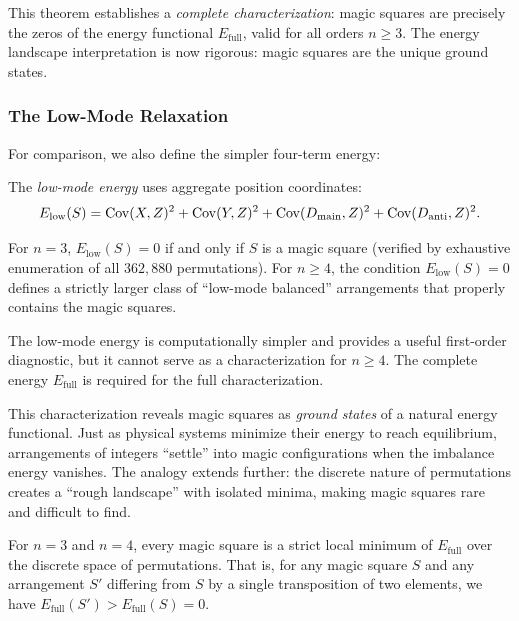 This theorem establishes a \emph{complete characterization}: magic squares are precisely the zeros 
of the energy functional $E_{\mathrm{full}}$, valid for all orders $n \geq 3$.
The energy landscape interpretation is now rigorous: magic squares are the unique ground states.

\subsubsection{The Low-Mode Relaxation}

For comparison, we also define the simpler four-term energy:

\begin{definition}
\label{def:lowmode_energy}
The \emph{low-mode energy} uses aggregate position coordinates:
\begin{equation}
E_{\mathrm{low}}(S) = \mathrm{Cov}(X, Z)^2 + \mathrm{Cov}(Y, Z)^2 + \mathrm{Cov}(D_{\mathrm{main}}, Z)^2 + \mathrm{Cov}(D_{\mathrm{anti}}, Z)^2.
\label{eq:lowmode_energy}
\end{equation}
\end{definition}

\begin{proposition}
\label{prop:lowmode_char}
For $n = 3$, $E_{\mathrm{low}}(S) = 0$ if and only if $S$ is a magic square 
(verified by exhaustive enumeration of all $362{,}880$ permutations).
For $n \geq 4$, the condition $E_{\mathrm{low}}(S) = 0$ defines a strictly larger class 
of ``low-mode balanced'' arrangements that properly contains the magic squares.
\end{proposition}

The low-mode energy is computationally simpler and provides a useful first-order diagnostic,
but it cannot serve as a characterization for $n \geq 4$.
The complete energy $E_{\mathrm{full}}$ is required for the full characterization.

This characterization reveals magic squares as \emph{ground states} of a natural energy functional.
Just as physical systems minimize their energy to reach equilibrium,
arrangements of integers ``settle'' into magic configurations when the imbalance energy vanishes.
The analogy extends further: the discrete nature of permutations creates a ``rough landscape'' 
with isolated minima, making magic squares rare and difficult to find.

\begin{proposition}
\label{prop:isolation}
For $n = 3$ and $n = 4$, every magic square is a strict local minimum of $E_{\mathrm{full}}$ 
over the discrete space of permutations.
That is, for any magic square $S$ and any arrangement $S'$ differing from $S$ 
by a single transposition of two elements, we have $E_{\mathrm{full}}(S') > E_{\mathrm{full}}(S) = 0$.
\end{proposition}

